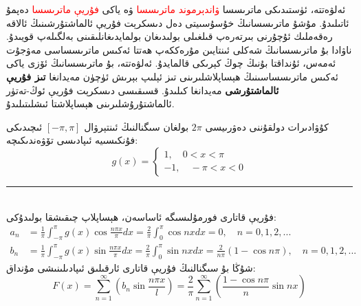 ئەلۋەتتە، ئۈستىدىكى ماترىسسا 
\textcolor{red}{ۋاندېرموند ماترىسسا}
ۋە ياكى 
\textcolor{red}{ فۇريې ماترىسسا}
دەپمۇ ئاتىلىدۇ. مۇشۇ ماترىسسانىڭ خۇسۇسىيتى دەل دىسكرېت فۇريې ئالماشتۇرشىنىڭ ئالاقە رەقەملىك ئۇچۇرنى بىرتەرەپ قىلغىلى بولىدىغان بولمايدىغانلىقىنى بەلگىلەپ قويىدۇ. ناۋادا بۇ ماترىسسانىڭ شەكلى ئىنتايىن مۇرەككەپ ھەتتا ئەكىس ماترىسساسى مەۋجۇت ئەمەس، ئۇنداقتا بۇنىڭ چوڭ كېرىكى قالمايدۇ. ئەلۋەتتە، بۇ ماترىسسانىڭ ئۆزى ياكى ئەكىس ماترىسساسىنىڭ ھېساپلاشلىرىنى تىز ئېلىپ بېرىش ئۈچۈن مەيدانغا 
  \textbf{تىز فۇريې ئالماشتۇرشى}
   مەيدانغا كىلىدۇ. قسىقىسى دىسكرېت فۇريې ئوڭ-تەتۈر ئالماشتۇرۇشلىرىنى ھېساپلاشتا ئىشلىتىلىدۇ.

\begin{myexample}
	كۇۋادىرات دولقۇننى دەۋرىيسى $2\pi$ بولغان سىگنالنىڭ ئىنتېرۋال $[-\pi,\pi]$ ئىچىدىكى فۇنكىسىيە ئىپادىسى تۆۋەندىكىچە:
	$$g(x) = 
	\begin{cases}
		1 ,\quad 0 < x < \pi \\
		-1 , \quad -\pi < x < 0
	\end{cases}
	$$
	\rule{\linewidth}{0.05em}\\
	فۇريې قاتارى فورمۇلىسىگە ئاساسەن، ھېساپلاپ چىقىشقا بولىدۇكى:
\begin{align*}
a_n &= \frac{1}{\pi} \int_{-\pi}^{\pi}g(x) \cos \frac{n \pi x}{\pi} dx 
= \frac{2}{\pi} \int_{0}^{\pi}\cos nxdx = 0, \quad n=0,1,2,...\\
b_n &= \frac{1}{\pi} \int_{-\pi}^{\pi}g(x) \sin \frac{n \pi x}{\pi} dx
= \frac{2}{\pi} \int_{0}^{\pi}\sin nxdx = \frac{2}{n\pi}(1-\cos n\pi), \quad n=0,1,2,...
\end{align*}
شۇڭا بۇ سىگنالنىڭ فۇريې قاتارى ئارقىلىق ئىپادىلىنىشى مۇنداق:
$$
F(x)=\sum_{n=1}^{\infty}(b_n\sin \frac{n \pi x}{l}) = \frac{2}{\pi} \sum_{n=1}^{\infty}(\frac{1-\cos n\pi}{n} \sin nx)
$$
\end{myexample}








